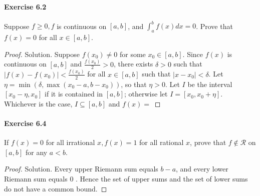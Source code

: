 \documentclass{article}
\theoremstyle{definition}
\begin{document}
\paragraph{Exercise 6.2} Suppose $f \geq 0, f$ is continuous on $[a, b]$, and $\int_{a}^{b} f(x) d x=0$. Prove that $f(x)=0$ for all $x \in[a, b]$.
\begin{proof}
    Solution. Suppose $f\left(x_0\right) \neq 0$ for some $x_0 \in[a, b]$. Since $f(x)$ is continuous on $[a, b]$ and $\frac{f\left(x_0\right)}{2}>0$, there exists $\delta>0$ such that $\left|f(x)-f\left(x_0\right)\right|<\frac{f\left(x_0\right)}{2}$ for all $x \in[a, b]$ such that $\left|x-x_0\right|<\delta$. Let $\eta=\min \left(\delta, \max \left(x_0-a, b-x_0\right)\right)$, so that $\eta>0$. Let $I$ be the interval $\left[x_0-\eta, x_0\right]$ if it is contained in $[a, b]$; otherwise let $I=\left[x_0, x_0+\eta\right]$. Whichever is the case, $I \subseteq[a, b]$ and $f(x)=$
\end{proof}


\paragraph{Exercise 6.4} If $f(x)=0$ for all irrational $x, f(x)=1$ for all rational $x$, prove that $f \notin \mathcal{R}$ on $[a, b]$ for any $a<b$.
\begin{proof}
    Solution. Every upper Riemann sum equals $b-a$, and every lower Riemann sum equals 0 . Hence the set of upper sums and the set of lower sums do not have a common bound.
\end{proof}
\end{document}
